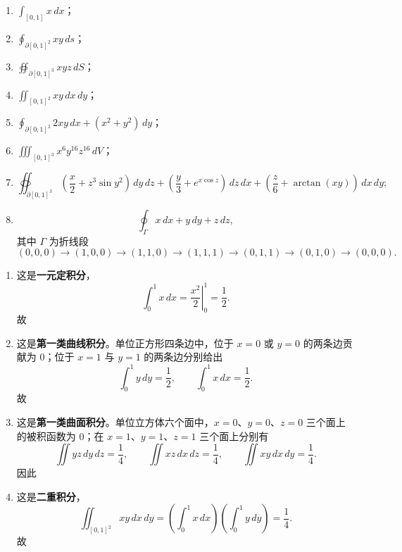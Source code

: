 ﻿

\begin{question}[指出积分类型并计算]

\begin{enumerate}[label=(\arabic*),leftmargin=2.6em,itemsep=0.25em,topsep=0.2em]
\item $\int_{[0,1]}x\,dx$；
\item $\oint_{\partial[0,1]^2}xy\,ds$；
\item $\oiint_{\partial[0,1]^3}xyz\,dS$；
\item $\iint_{[0,1]^2}xy\,dx\,dy$；
\item $\oint_{\partial[0,1]^2}2xy\,dx+(x^2+y^2)\,dy$；
\item $\iiint_{[0,1]^3}x^6y^{16}z^{16}\,dV$；
\item
\[
\oiint_{\partial[0,1]^3}\left(\frac{x}{2}+z^3\sin y^2\right)\,dy\,dz
+\left(\frac{y}{3}+e^{x\cos z}\right)\,dz\,dx
+\left(\frac{z}{6}+\arctan(xy)\right)\,dx\,dy;
\]
\item
\[
\oint_{\Gamma}x\,dx+y\,dy+z\,dz,
\]
其中 $\Gamma$ 为折线段
\[
(0,0,0)\to(1,0,0)\to(1,1,0)\to(1,1,1)\to(0,1,1)\to(0,1,0)\to(0,0,0).
\]
\end{enumerate}

\begin{solution}
\begin{enumerate}[label=(\arabic*),leftmargin=2.6em,itemsep=0.25em,topsep=0.2em]
\item 这是\textbf{一元定积分}，
\[
\int_0^1 x\,dx=\left.\frac{x^2}{2}\right|_0^1=\frac12.
\]
故

\item 这是\textbf{第一类曲线积分}。单位正方形四条边中，位于 $x=0$ 或 $y=0$ 的两条边贡献为 $0$；位于 $x=1$ 与 $y=1$ 的两条边分别给出
\[
\int_0^1 y\,dy=\frac12,
\qquad
\int_0^1 x\,dx=\frac12.
\]
故

\item 这是\textbf{第一类曲面积分}。单位立方体六个面中，$x=0$、$y=0$、$z=0$ 三个面上的被积函数为 $0$；在 $x=1$、$y=1$、$z=1$ 三个面上分别有
\[
\iint yz\,dy\,dz=\frac14,\qquad
\iint xz\,dx\,dz=\frac14,\qquad
\iint xy\,dx\,dy=\frac14.
\]
因此

\item 这是\textbf{二重积分}，
\[
\iint_{[0,1]^2}xy\,dx\,dy
=\left(\int_0^1 x\,dx\right)\left(\int_0^1 y\,dy\right)
=\frac14.
\]
故


\end{enumerate}
\end{solution}
\end{question}
